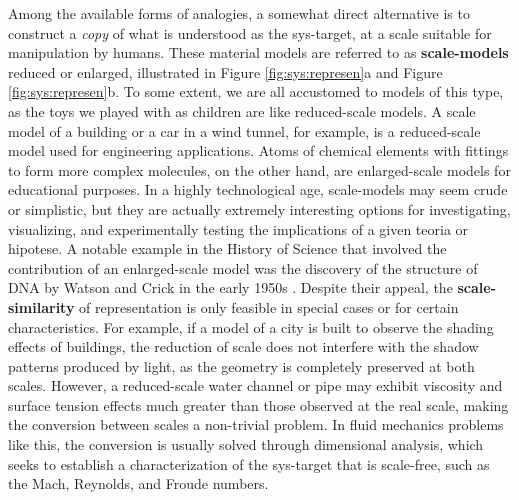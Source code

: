 \documentclass[./main_en.tex]{subfiles}
\begin{document}
\par Among the available forms of analogies, a somewhat direct alternative is to construct a \textit{copy} of what is understood as the \gls{sys-target}, at a scale suitable for manipulation by humans. These material models are referred to as \textbf{\gls{scale-models}} reduced or enlarged, illustrated in Figure \ref{fig:sys:represen}a and Figure \ref{fig:sys:represen}b. To some extent, we are all accustomed to models of this type, as the toys we played with as children are like reduced-scale models. A scale model of a building or a car in a wind tunnel, for example, is a reduced-scale \gls{model} used for engineering applications. Atoms of chemical elements with fittings to form more complex molecules, on the other hand, are enlarged-scale models for educational purposes. In a highly technological age, \gls{scale-models} may seem crude or simplistic, but they are actually extremely interesting options for investigating, visualizing, and experimentally testing the implications of a given \gls{teoria} or \gls{hipotese}. A notable example in the History of Science that involved the contribution of an enlarged-scale \gls{model} was the discovery of the structure of DNA by Watson and Crick in the early 1950s \cite{deChadarevian2003}. Despite their appeal, the \textbf{\gls{scale-similarity}} of representation is only feasible in special cases or for certain characteristics. For example, if a model of a city is built to observe the shading effects of buildings, the reduction of scale does not interfere with the shadow patterns produced by light, as the geometry is completely preserved at both scales. However, a reduced-scale water channel or pipe may exhibit viscosity and surface tension effects much greater than those observed at the real scale, making the conversion between scales a non-trivial problem. In fluid mechanics problems like this, the conversion is usually solved through dimensional analysis, which seeks to establish a characterization of the \gls{sys-target} that is scale-free, such as the Mach, Reynolds, and Froude numbers.
\end{document}
